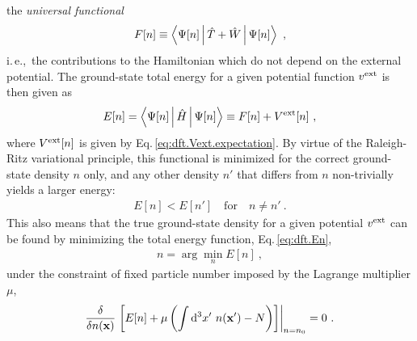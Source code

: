  the \emph{universal functional} 
\begin{align}
	F[n] \equiv \Braket{\Psi [n] | \hat T + \hat W | \Psi [n]}~,
	\label{eq:dft.Fn}
\end{align}
i.\,e.,~the contributions to the Hamiltonian which do not depend on the external potential. The ground-state total energy for a given potential function $v^{\rm ext}$ is then given as
\begin{align}
	E [n] 
		= \Braket{\Psi [n] | \hat H | \Psi [n]}
		\equiv F[n] + V^{\rm ext}[n]~,
	\label{eq:dft.En}
\end{align}
where $V^{\rm ext}[n]$ is given by Eq.\,\eqref{eq:dft.Vext.expectation}.
By virtue of the Raleigh-Ritz variational principle, this functional is minimized for the correct ground-state density $n$ only, and any other density $n'$ that differs from $n$ non-trivially yields a larger energy:
\begin{align}
	E[n] < E [n'] \quad \text{for} \quad n \neq n'~.
\end{align}
This also means that the true ground-state density for a given potential $v^{\rm ext}$ can be found by minimizing the total energy function, Eq.\,\eqref{eq:dft.En},
\begin{align}
	n = \arg \min_{n} E[n]~,
	\label{eq:dft.n}
\end{align}
under the constraint of fixed particle number imposed by the Lagrange multiplier $\mu$,
\begin{align}
	\frac{\delta}{\delta n ({\bf x})}
		\left.\left[ 
			E[n] + \mu \left(
				\int \d^3 x' ~ n ({\bf x}') - N \right)
		\right]\right\vert_{n = n_0}
		=0~.
		\label{eq:dft.stationarity}
\end{align}

